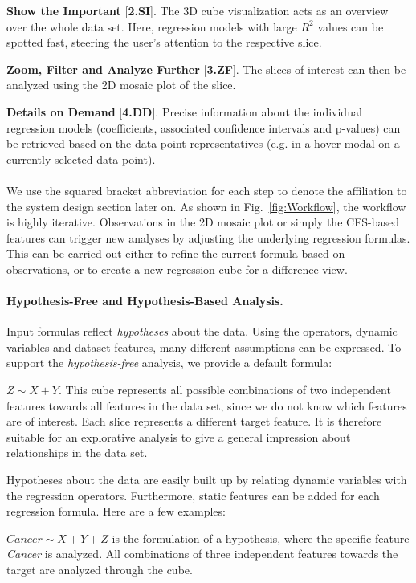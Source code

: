 \documentclass[journal]{style/vgtc} 			          %
\begin{document}
\textbf{Show the Important} [\textbf{2.SI}]. The 3D cube visualization acts as an overview over the whole data set.
Here, regression models with large $R^2$ values can be spotted fast, steering the user's attention to the respective slice.

\textbf{Zoom, Filter and Analyze Further} [\textbf{3.ZF}]. The slices of interest can then be analyzed using the 2D mosaic plot of the slice.

\textbf{Details on Demand} [\textbf{4.DD}]. Precise information about the individual regression models (coefficients, associated confidence intervals and p-values) can be retrieved based on the data point representatives (e.g. in a hover modal on a currently selected data point).
\\\\
We use the squared bracket abbreviation for each step to denote the affiliation to the system design section later on.
As shown in Fig.~\ref{fig:Workflow}, the workflow is highly iterative.
Observations in the 2D mosaic plot or simply the CFS-based features can trigger new analyses by adjusting the underlying regression formulas.
This can be carried out either to refine the current formula based on observations, or to create a new regression cube for a difference view.
\paragraph{Hypothesis-Free and Hypothesis-Based Analysis.}
Input formulas reflect \emph{hypotheses} about the data.
Using the operators, dynamic variables and dataset features, many different assumptions can be expressed.
To support the \emph{hypothesis-free} analysis, we provide a default formula:

$Z \sim X + Y$.
This cube represents all possible combinations of two independent features towards all features in the data set, since we do not know which features are of interest.
Each slice represents a different target feature.
It is therefore suitable for an explorative analysis to give a general impression about relationships in the data set.

Hypotheses about the data are easily built up by relating dynamic variables with the regression operators.
Furthermore, static features can be added for each regression formula.
Here are a few examples:

$Cancer \sim X + Y + Z$ is the formulation of a hypothesis, where the specific feature \textit{Cancer} is analyzed.
All combinations of three independent features towards the target are analyzed through the cube.
\end{document}
